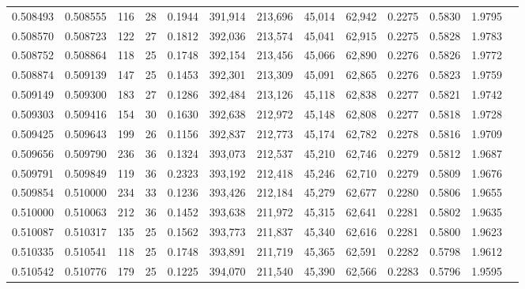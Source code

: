 \begin{tabular}{rrrrrrrrrrrrr}
0.508493 & 0.508555 &    116 &    28 &                                     0.1944 & 391,914 & 213,696 &  45,014 &  62,942 & 0.2275 & 0.5830 & 1.9795 \\
0.508570 & 0.508723 &    122 &    27 &                                     0.1812 & 392,036 & 213,574 &  45,041 &  62,915 & 0.2275 & 0.5828 & 1.9783 \\
0.508752 & 0.508864 &    118 &    25 &                                     0.1748 & 392,154 & 213,456 &  45,066 &  62,890 & 0.2276 & 0.5826 & 1.9772 \\
0.508874 & 0.509139 &    147 &    25 &                                     0.1453 & 392,301 & 213,309 &  45,091 &  62,865 & 0.2276 & 0.5823 & 1.9759 \\
0.509149 & 0.509300 &    183 &    27 &                                     0.1286 & 392,484 & 213,126 &  45,118 &  62,838 & 0.2277 & 0.5821 & 1.9742 \\
0.509303 & 0.509416 &    154 &    30 &                                     0.1630 & 392,638 & 212,972 &  45,148 &  62,808 & 0.2277 & 0.5818 & 1.9728 \\
0.509425 & 0.509643 &    199 &    26 &                                     0.1156 & 392,837 & 212,773 &  45,174 &  62,782 & 0.2278 & 0.5816 & 1.9709 \\
0.509656 & 0.509790 &    236 &    36 &                                     0.1324 & 393,073 & 212,537 &  45,210 &  62,746 & 0.2279 & 0.5812 & 1.9687 \\
0.509791 & 0.509849 &    119 &    36 &                                     0.2323 & 393,192 & 212,418 &  45,246 &  62,710 & 0.2279 & 0.5809 & 1.9676 \\
0.509854 & 0.510000 &    234 &    33 &                                     0.1236 & 393,426 & 212,184 &  45,279 &  62,677 & 0.2280 & 0.5806 & 1.9655 \\
0.510000 & 0.510063 &    212 &    36 &                                     0.1452 & 393,638 & 211,972 &  45,315 &  62,641 & 0.2281 & 0.5802 & 1.9635 \\
0.510087 & 0.510317 &    135 &    25 &                                     0.1562 & 393,773 & 211,837 &  45,340 &  62,616 & 0.2281 & 0.5800 & 1.9623 \\
0.510335 & 0.510541 &    118 &    25 &                                     0.1748 & 393,891 & 211,719 &  45,365 &  62,591 & 0.2282 & 0.5798 & 1.9612 \\
0.510542 & 0.510776 &    179 &    25 &                                     0.1225 & 394,070 & 211,540 &  45,390 &  62,566 & 0.2283 & 0.5796 & 1.9595 \\

\end{tabular}
